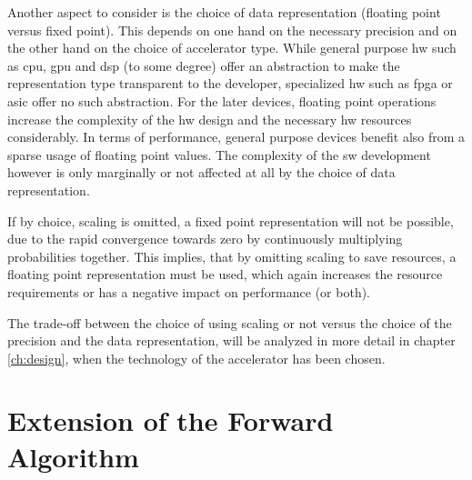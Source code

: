 \documentclass[mscthesis]{usiinfthesis}
\begin{document}
Another aspect to consider is the choice of data representation (floating point
versus fixed point). This depends on one hand on the necessary precision and on
the other hand on the choice of accelerator type. While general purpose
\gls{hw} such as \gls{cpu}, \gls{gpu} and \gls{dsp} (to some degree) offer an
abstraction to make the representation type transparent to the developer,
specialized \gls{hw} such as \gls{fpga} or \gls{asic} offer no such
abstraction. For the later devices, floating point operations increase the
complexity of the \gls{hw} design and the necessary \gls{hw} resources
considerably. In terms of performance, general purpose devices benefit also
from a sparse usage of floating point values. The complexity of the \gls{sw}
development however is only marginally or not affected at all by the choice of
data representation.

If by choice, scaling is omitted, a fixed point representation will not be
possible, due to the rapid convergence towards zero by continuously multiplying
probabilities together. This implies, that by omitting scaling to save
resources, a floating point representation must be used, which again increases
the resource requirements or has a negative impact on performance (or both).

The trade-off between the choice of using scaling or not versus the choice of
the precision and the data representation, will be analyzed in more detail in
chapter \ref{ch:design}, when the technology of the accelerator has been
chosen.

\section{Extension of the Forward Algorithm}
\label{ch:analysis_extension}
\end{document}
